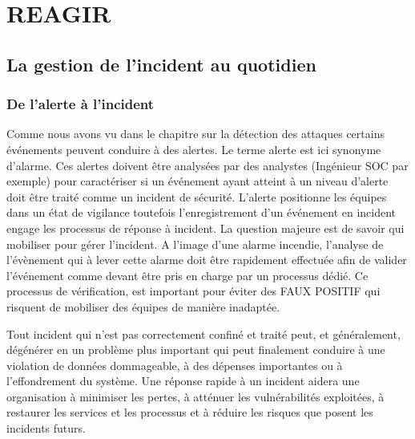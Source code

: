 %
%

\section{REAGIR}


\subsection{La gestion de l'incident au quotidien} 

\subsubsection{De l'alerte à l'incident}

Comme nous avons vu dans le chapitre sur la détection des attaques certains événements peuvent conduire à des alertes. Le terme alerte est ici synonyme d'alarme.  Ces alertes  doivent être analysées par des  analystes (Ingénieur SOC par exemple) pour caractériser si un événement ayant atteint à un niveau d'alerte doit être traité comme un incident de sécurité. L'alerte positionne les équipes dans un état de vigilance toutefois l'enregistrement d'un événement en incident engage les processus de réponse à  incident.
La question majeure est de savoir qui  mobiliser pour gérer l'incident. A l'image d'une alarme incendie, l'analyse de l'évènement qui à lever cette alarme doit être rapidement effectuée afin de valider l'événement comme devant être pris en charge par un processus dédié. 
Ce processus de vérification, est important pour éviter des FAUX POSITIF qui risquent de mobiliser des équipes de manière inadaptée.

Tout incident qui n'est pas correctement confiné et traité peut, et généralement, dégénérer en un problème plus important qui peut finalement conduire à une violation de données dommageable, à des dépenses importantes ou à l'effondrement du système. Une réponse rapide à un incident aidera une organisation à minimiser les pertes, à atténuer les vulnérabilités exploitées, à restaurer les services et les processus et à réduire les risques que posent les incidents futurs.
 
